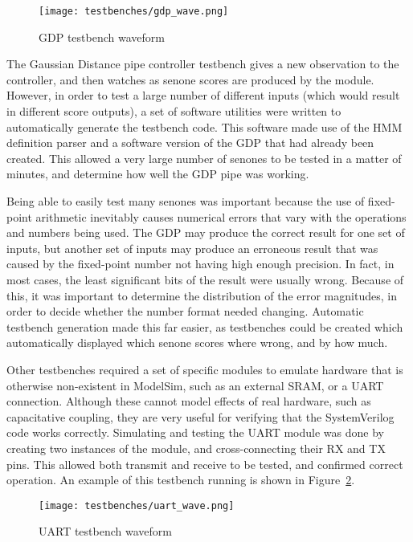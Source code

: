 		\begin{figure}[tb]
			\begin{center}
				\texttt{[image: testbenches/gdp\_wave.png]}
			\end{center}
			\caption{GDP testbench waveform}
			\label{fig:test_gdp}
		\end{figure}
		
		The Gaussian Distance pipe controller testbench gives a new observation to the controller, and then watches as senone scores are produced by the module.  However, in order to test a large number of different inputs (which would result in different score outputs), a set of software utilities were written to automatically generate the testbench code.  This software made use of the HMM definition parser and a software version of the GDP that had already been created.  This allowed a very large number of senones to be tested in a matter of minutes, and determine how well the GDP pipe was working.

		Being able to easily test many senones was important because the use of fixed-point arithmetic inevitably causes numerical errors that vary with the operations and numbers being used.  The GDP may produce the correct result for one set of inputs, but another set of inputs may produce an erroneous result that was caused by the fixed-point number not having high enough precision.  In fact, in most cases, the least significant bits of the result were usually wrong.  Because of this, it was important to determine the distribution of the error magnitudes, in order to decide whether the number format needed changing.  Automatic testbench generation made this far easier, as testbenches could be created which automatically displayed which senone scores where wrong, and by how much.

		Other testbenches required a set of specific modules to emulate hardware that is otherwise non-existent in ModelSim, such as an external SRAM, or a UART connection.  Although these cannot model effects of real hardware, such as capacitative coupling, they are very useful for verifying that the SystemVerilog code works correctly.  Simulating and testing the UART module was done by creating two instances of the module, and cross-connecting their RX and TX pins.  This allowed both transmit and receive to be tested, and confirmed correct operation.  An example of this testbench running is shown in Figure~\ref{fig:test_uart}.  

		\begin{figure}[tb]
			\begin{center}
				\texttt{[image: testbenches/uart\_wave.png]}
			\end{center}
			\caption{UART testbench waveform}
			\label{fig:test_uart}
		\end{figure}

